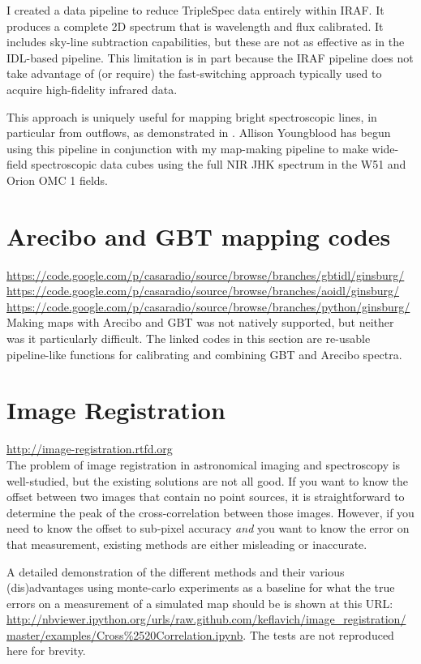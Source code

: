 I created a data pipeline to reduce TripleSpec data entirely within IRAF.  It
produces a complete 2D spectrum that is wavelength and flux calibrated.  It
includes sky-line subtraction capabilities, but these are not as effective as
in the IDL-based pipeline.  This limitation is in part because the IRAF
pipeline does not take advantage of (or require) the fast-switching approach
typically used to acquire high-fidelity infrared data.

This approach is uniquely useful for mapping bright spectroscopic lines, in
particular from outflows, as demonstrated in \citet{Ginsburg2009}.  Allison
Youngblood has begun using this pipeline in conjunction with my map-making
pipeline to make wide-field spectroscopic data cubes using the full NIR JHK
spectrum in the W51 and Orion OMC 1 fields.

\section{Arecibo and GBT mapping codes}
\url{https://code.google.com/p/casaradio/source/browse/branches/gbtidl/ginsburg/} \\
\url{https://code.google.com/p/casaradio/source/browse/branches/aoidl/ginsburg/} \\
\url{https://code.google.com/p/casaradio/source/browse/branches/python/ginsburg/} \\

Making maps with Arecibo and GBT was not natively supported, but neither was it
particularly difficult.  The linked codes in this section are re-usable
pipeline-like functions for calibrating and combining GBT and Arecibo spectra.

\section{Image Registration}
\url{http://image-registration.rtfd.org}\\
The problem of image registration in astronomical imaging and spectroscopy is
well-studied, but the existing solutions are not all good.  If you want to know
the offset between two images that contain no point sources, it is
straightforward to determine the peak of the cross-correlation between those
images.  However, if you need to know the offset to sub-pixel accuracy
\emph{and} you want to know the error on that measurement, existing methods are
either misleading or inaccurate.

A detailed demonstration of the different methods and their various
(dis)advantages using monte-carlo experiments as a baseline for what the true
errors on a measurement of a simulated map should be is shown at this URL:
\url{http://nbviewer.ipython.org/urls/raw.github.com/keflavich/image_registration/master/examples/Cross%2520Correlation.ipynb}.
The tests are not reproduced here for brevity.

